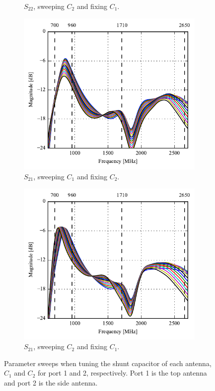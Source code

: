 \begin{figure}[htbp]
\begin{subfigure}{0.49\linewidth}
        \caption{$S_{22}$, sweeping $C_2$ and fixing $C_1$.}
    \end{subfigure}
    \vspace*{1em}
    \begin{subfigure}{0.49\linewidth}
        \centering
        \includegraphics{img/tech_sol/trianglefeed/Csh1s21.pdf}
        \caption{$S_{21}$, sweeping $C_1$ and fixing $C_2$.}
    \end{subfigure}
    \hfill
    \begin{subfigure}{0.49\linewidth}
        \centering
        \includegraphics{img/tech_sol/trianglefeed/Csh2s21.pdf}
        \caption{$S_{21}$, sweeping $C_2$ and fixing $C_1$.}
    \end{subfigure}
    \caption{Parameter sweeps when tuning the shunt capacitor of each antenna, $C_{1}$ and $C_{2}$ for port 1 and 2, respectively. Port 1 is the top antenna and port 2 is the side antenna.}
    \label{fig:ant2sweeps}
\end{figure}

